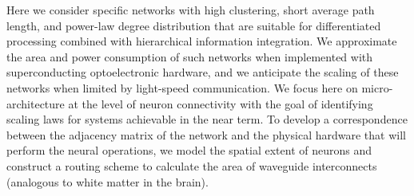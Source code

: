\documentclass[aip,amsmath,amssymb,reprint,nofootinbib]{revtex4-1}
\begin{document}
Here we consider specific networks with high clustering, short average path length, and power-law degree distribution that are suitable for differentiated processing combined with hierarchical information integration. We approximate the area and power consumption of such networks when implemented with superconducting optoelectronic hardware, and we anticipate the scaling of these networks when limited by light-speed communication. We focus here on micro-architecture at the level of neuron connectivity with the goal of identifying scaling laws for systems achievable in the near term. To develop a correspondence between the adjacency matrix of the network \cite{eskn2015} and the physical hardware that will perform the neural operations, we model the spatial extent of neurons and construct a routing scheme to calculate the area of waveguide interconnects (analogous to white matter in the brain).
	
\end{document}
